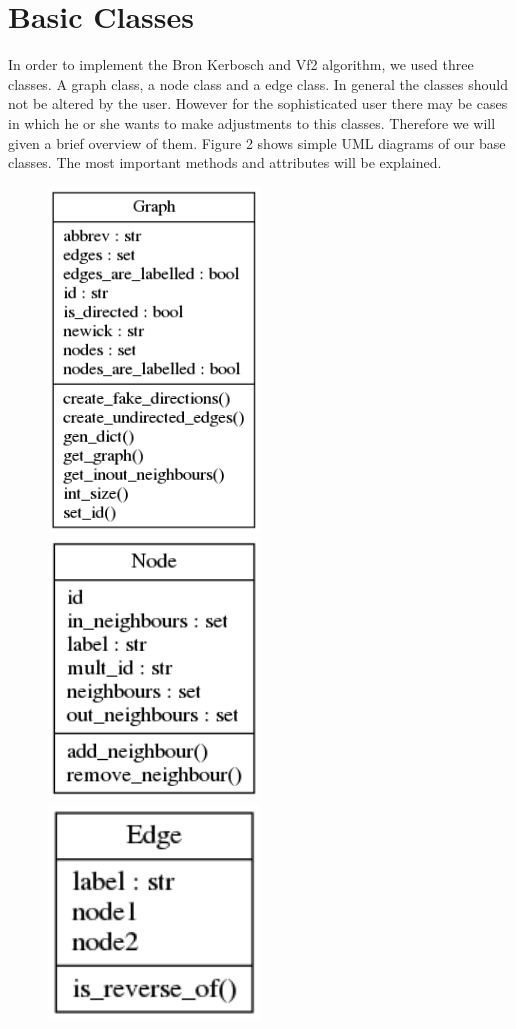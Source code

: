 \documentclass{SeminarV2}
\begin{document}
\section{Basic Classes}
In order to implement the Bron Kerbosch and Vf2 algorithm, we used three classes.
A graph class, a node class and a edge class. In general the classes should not be altered
by the user. However for the sophisticated user there may be cases in which he or she
wants to make adjustments to this classes. Therefore we will given a brief
overview of them. Figure 2 shows simple UML diagrams of our base classes. The most important methods and attributes will be explained.
\begin{figure}
     \includegraphics[width=0.5\textwidth]{classes.png}
    \includegraphics[width=0.5\textwidth]{node.png}
    \includegraphics[width=0.5\textwidth]{edge.png}



\end{figure}
\end{document}
